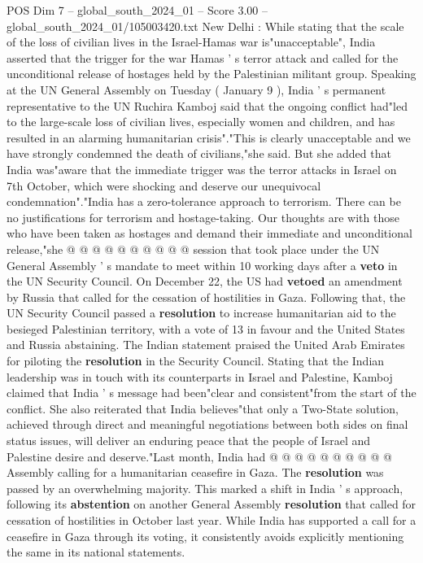 \begin{textsample}{POS Dim 7 – global\_south\_2024\_01 – Score 3.00 – global\_south\_2024\_01/105003420.txt}  \label{ex:f7_pos_041}
New Delhi : While stating that the scale of the loss of civilian lives in the Israel-Hamas war is"unacceptable", India asserted that the trigger for the war Hamas ' s terror attack and called for the unconditional release of hostages held by the Palestinian militant group.
Speaking at the UN General Assembly on Tuesday ( January 9 ), India ' s permanent representative to the UN Ruchira Kamboj said that the ongoing conflict had"led to the large-scale loss of civilian lives, especially women and children, and has resulted in an alarming humanitarian crisis"."This is clearly unacceptable and we have strongly condemned the death of civilians,"she said.
But she added that India was"aware that the immediate trigger was the terror attacks in Israel on 7th October, which were shocking and deserve our unequivocal condemnation"."India has a zero-tolerance approach to terrorism.
There can be no justifications for terrorism and hostage-taking.
Our thoughts are with those who have been taken as hostages and demand their immediate and unconditional release,"she @ @ @ @ @ @ @ @ @ @ session that took place under the UN General Assembly ' s mandate to meet within 10 working days after a \textbf{veto} in the UN Security Council.
On December 22, the US had \textbf{vetoed} an amendment by Russia that called for the cessation of hostilities in Gaza.
Following that, the UN Security Council passed a \textbf{resolution} to increase humanitarian aid to the besieged Palestinian territory, with a vote of 13 in favour and the United States and Russia abstaining.
The Indian statement praised the United Arab Emirates for piloting the \textbf{resolution} in the Security Council.
Stating that the Indian leadership was in touch with its counterparts in Israel and Palestine, Kamboj claimed that India ' s message had been"clear and consistent"from the start of the conflict.
She also reiterated that India believes"that only a Two-State solution, achieved through direct and meaningful negotiations between both sides on final status issues, will deliver an enduring peace that the people of Israel and Palestine desire and deserve."Last month, India had @ @ @ @ @ @ @ @ @ @ Assembly calling for a humanitarian ceasefire in Gaza.
The \textbf{resolution} was passed by an overwhelming majority.
This marked a shift in India ' s approach, following its \textbf{abstention} on another General Assembly \textbf{resolution} that called for cessation of hostilities in October last year.
While India has supported a call for a ceasefire in Gaza through its voting, it consistently avoids explicitly mentioning the same in its national statements.

\end{textsample}
